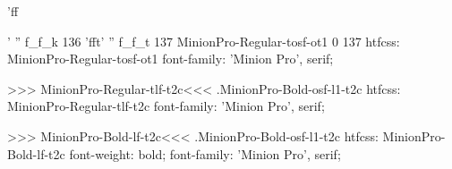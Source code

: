 'ff{' '' f_f_k 136
'fft' '' f_f_t 137
MinionPro-Regular-tosf-ot1 0 137
htfcss:  MinionPro-Regular-tosf-ot1  font-family: 'Minion Pro', serif;

>>>
\<MinionPro-Regular-tlf-t2c\><<<
.MinionPro-Bold-osf-l1-t2c
htfcss:  MinionPro-Regular-tlf-t2c  font-family: 'Minion Pro', serif;

>>>
\<MinionPro-Bold-lf-t2c\><<<
.MinionPro-Bold-osf-l1-t2c
htfcss:  MinionPro-Bold-lf-t2c  font-weight: bold; font-family: 'Minion Pro', serif;

}
